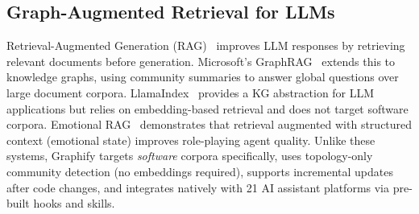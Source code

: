 \subsection{Graph-Augmented Retrieval for LLMs}

Retrieval-Augmented Generation (RAG)~\cite{lewis2020rag} improves LLM responses
by retrieving relevant documents before generation.
Microsoft's GraphRAG~\cite{edge2024graphrag} extends this to knowledge graphs,
using community summaries to answer global questions over large document corpora.
LlamaIndex~\cite{llamaindex2022} provides a KG abstraction for LLM applications
but relies on embedding-based retrieval and does not target software corpora.
Emotional RAG~\cite{huang2024emotional} demonstrates that retrieval augmented
with structured context (emotional state) improves role-playing agent quality.
Unlike these systems, Graphify targets \emph{software} corpora specifically,
uses topology-only community detection (no embeddings required), supports
incremental updates after code changes, and integrates natively with 21 AI
assistant platforms via pre-built hooks and skills.
